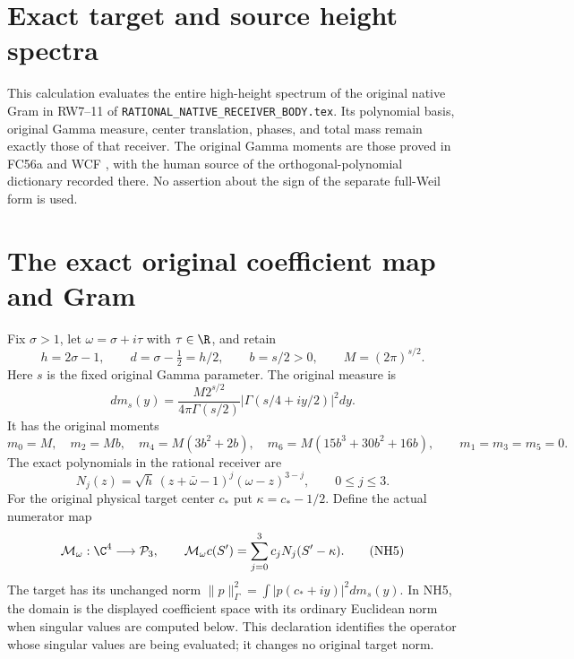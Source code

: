 \section{Exact target and source height spectra}

This calculation evaluates the entire high-height spectrum of the
original native Gram in RW7--11 of
\texttt{RATIONAL\_NATIVE\_RECEIVER\_BODY.tex}. Its polynomial
basis, original Gamma measure, center translation, phases, and total
mass remain exactly those of that receiver. The original Gamma
moments are those proved in FC56a and WCF \cite{WCF}, with the
human source of the orthogonal-polynomial dictionary recorded there.
No assertion about the sign of the separate full-Weil form is used.

\section{The exact original coefficient map and Gram}
Fix $\sigma>1$, let $\omega=\sigma+i\tau$ with $\tau\in\R$,
and retain
\[
 h=2\sigma-1,\qquad d=\sigma-\tfrac12=h/2,\qquad
 b=s/2>0,\qquad M=(2\pi)^{s/2}.
 \tag{NH1}
\]
Here $s$ is the fixed original Gamma parameter. The original measure is
\[
 dm_s(y)=\frac{M2^{s/2}}{4\pi\Gamma(s/2)}
               |\Gamma(s/4+iy/2)|^2dy.
 \tag{NH2}
\]
It has the original moments
\[
 m_0=M,\quad m_2=Mb,\quad m_4=M(3b^2+2b),\quad
 m_6=M(15b^3+30b^2+16b),\qquad m_1=m_3=m_5=0.
 \tag{NH3}
\]
The exact polynomials in the rational receiver are
\[
 N_j(z)=\sqrt h\,(z+\bar\omega-1)^j(\omega-z)^{3-j},
 \qquad 0\le j\le3.
 \tag{NH4}
\]
For the original physical target center $c_*$ put
$\kappa=c_*-1/2$. Define the actual numerator map
\[
 \mathcal M_\omega:\C^4\longrightarrow\mathcal P_3,
 \qquad \mathcal M_\omega c(S')=\sum_{j=0}^3c_jN_j(S'-\kappa).
 \tag{NH5}
\]
The target has its unchanged norm
$\|p\|_\Gamma^2=\int|p(c_*+iy)|^2dm_s(y)$.
In NH5, the domain is the displayed coefficient space with its
ordinary Euclidean norm when singular values are computed below.
This declaration identifies the operator whose singular values are
being evaluated; it changes no original target norm.

